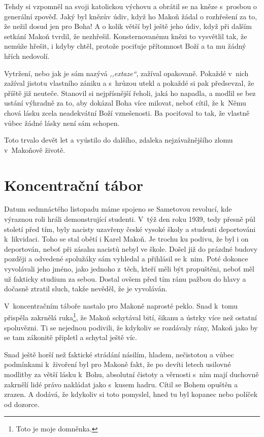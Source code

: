 Tehdy si vzpomněl na svoji katolickou výchovu a obrátil se na kněze s~prosbou o
generální zpověď. Jaký byl knězův údiv, když ho Makoň žádal o rozhřešení za to,
že nežil dosud jen pro Boha! A o kolik větší byl ještě jeho údiv, když při
dalším setkání Makoň tvrdil, že nezhřešil. Konsternovanému knězi to vysvětlil
tak, že nemůže hřešit, i kdyby chtěl, protože pociťuje přítomnost Boží a ta mu
žádný hřích nedovolí.

Vytržení, nebo jak je sám nazývá \textit{,,extaze``}, zažíval opakovaně. Pokaždé
v~nich zažíval jistotu vlastního zániku a s~hrůzou utekl a pokaždé si pak
předsevzal, že příště již neuteče. Stanovil si nejpřísnější řeholi, jaká ho
napadla, a modlil se bez ustání výhradně za to, aby dokázal Boha více milovat,
neboť cítil, že k~Němu chová lásku zcela neadekvátní Boží vznešenosti. Ba
pociťoval to tak, že vlastně vůbec žádné lásky není sám schopen.

Toto trvalo devět let a vyústilo do dalšího, zdaleka nejzávažnějšího zlomu
v~Makoňově životě.

\section{Koncentrační tábor}

Datum sedmnáctého listopadu máme spojeno se Sametovou revolucí, kde výraznou
roli hráli demonstrující studenti. V~týž den roku 1939, tedy
přesně půl století před tím, byly nacisty uzavřeny české vysoké školy a studenti
deportováni k~likvidaci. Toho se stal obětí i Karel Makoň. Je trochu ku podivu,
že byl i on deportován, neboť při zásahu nacistů nebyl ve škole. Došel již do
prázdné budovy později a odvedené spolužáky sám vyhledal a přihlásil se k~nim.
Poté dokonce vyvolávali jeho jméno, jako jednoho z~těch, kteří měli být
propuštěni, neboť měl už fakticky studium za sebou. Dostal ovšem před tím ránu
pažbou do hlavy a dočasně ztratil sluch, takže nevěděl, že je vyvoláván.

V~koncentračním táboře nastalo pro Makoně naprosté peklo. Snad k~tomu přispěla
zakrnělá ruka\footnote{Toto je moje domněnka.}, že Makoň schytával bití,
šikanu a ústrky více než ostatní spoluvězni. Ti se nejednou podivili, že
kdykoliv se rozdávaly rány, Makoň jako by se tam zákonitě připletl a schytal
ještě víc.

Snad ještě horší než faktické strádání násilím, hladem, nečistotou a vůbec
podmínkami k~živoření byl pro Makoně fakt, že po devíti letech usilovné modlitby
za větší lásku k~Bohu, absolutní čistoty a věrnosti s~ním mají duchovně
zakrnělí lidé právo nakládat jako s~kusem hadru. Cítil se Bohem opuštěn a
zrazen. A dodává, že kdykoliv si toto pomyslel, hned tu byl kopanec nebo políček
od dozorce.

